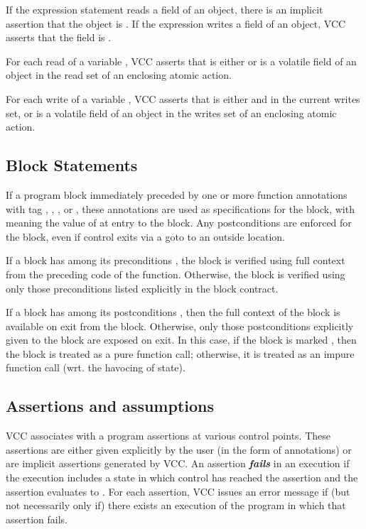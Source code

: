 \documentclass[preprint,nocopyrightspace]{sigplanconf}
\newcommand{\Def}[1]{\textit{\textbf{#1}}}
\begin{document}
{{{If the expression statement reads a field of an object, there is an
implicit assertion that the object is .
If the expression writes a field of an object, VCC asserts that the
field is \vcc{\writable}.  

For each read of a variable , VCC asserts that 
is either  or is a volatile field of an object in
the read set of an enclosing atomic action. 

For each write of a variable , VCC asserts that  is
either  and in the current writes set, or is a volatile
field of an object in the writes set of an enclosing atomic action.

\subsection{Block Statements}
If a program block immediately preceded by one or more function
annotations with tag , , ,
or , these annotations are used as specifications for the
block, with  meaning the value of  at entry to the
block. Any postconditions are enforced for the block, even if control
exits via a goto to an outside location.

If a block has among its
preconditions , the block is verified
using full context from the preceding code of the function. Otherwise,
the block is verified using only those preconditions listed explicitly
in the block contract.

If a block has among its
postconditions , then the full context
of the block is available on exit from the block. Otherwise, only
those postconditions explicitly given to the block are exposed on
exit. In this case, if the block is marked , then the
block is treated as a pure function call; otherwise, it is treated as
an impure function call (wrt. the havocing of state). 

\subsection{Assertions and assumptions}
VCC associates with a program assertions at various control
points. These assertions are either given explicitly by the user (in
the form of  annotations) or are implicit assertions
generated by VCC. An assertion \Def{fails} in an execution if the
execution includes a state in which control has reached the assertion
and the assertion evaluates to . For each assertion, VCC issues an
error message if (but not necessarily only if) there exists an
execution of the program in which that assertion fails.

}}}
\end{document}
